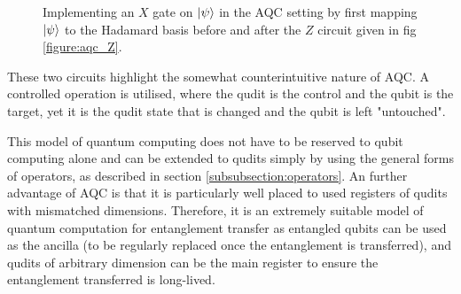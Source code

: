 \begin{figure}[h]
    \begin{center}
    \caption{Implementing an $X$ gate on $\ket{\psi}$ in the AQC setting by first mapping $\ket{\psi}$ to the Hadamard basis before and after the $Z$ circuit given in fig \ref{figure:aqc_Z}.}
    \label{figure:aqc_X}
    \end{center}
\end{figure}
These two circuits highlight the somewhat counterintuitive nature of AQC.
A controlled operation is utilised, where the qudit is the control and the qubit is the target, yet it is the qudit state that is changed and the qubit is left "untouched".

This model of quantum computing does not have to be reserved to qubit computing alone and can be extended to qudits simply by using the general forms of operators, as described in section \ref{subsubsection:operators}.
An further advantage of AQC is that it is particularly well placed to used registers of qudits with mismatched dimensions.
Therefore, it is an extremely suitable model of quantum computation for entanglement transfer as entangled qubits can be used as the ancilla (to be regularly replaced once the entanglement is transferred), and qudits of arbitrary dimension can be the main register to ensure the entanglement transferred is long-lived.